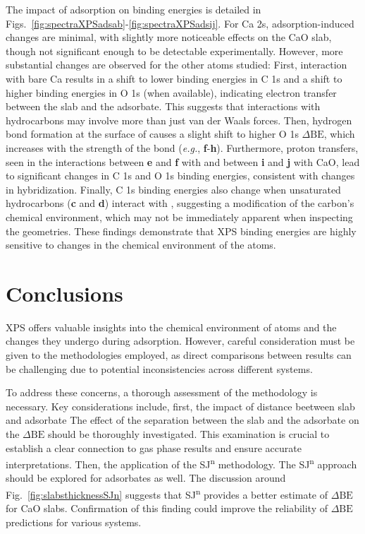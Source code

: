 \documentclass[journal=jpccck,manuscript=article]{achemso}
\def\dbe{\ensuremath{\Delta\text{BE}}}
\begin{document}
The impact of adsorption on binding energies is detailed in Figs.~\ref{fig:spectraXPSadsab}-\ref{fig:spectraXPSadsij}. For Ca 2s, adsorption-induced changes are minimal, with slightly more noticeable effects on the CaO slab, though not significant enough to be detectable experimentally. However, more substantial changes are observed for the other atoms studied: 
First, interaction with bare Ca results in a shift to lower binding energies in C 1s and a shift to higher binding energies in O 1s (when available), indicating electron transfer between the slab and the adsorbate. This suggests that interactions with hydrocarbons may involve more than just van der Waals forces. Then, hydrogen bond formation at the surface of  causes a slight shift to higher O 1s \dbe{}, which increases with the strength of the bond (\textit{e.g.}, \textbf{f}-\textbf{h}).
Furthermore, proton transfers, seen in the interactions between \textbf{e} and \textbf{f} with  and between \textbf{i} and \textbf{j} with CaO, lead to significant changes in C 1s and O 1s binding energies, consistent with changes in hybridization. Finally, C 1s binding energies also change when unsaturated hydrocarbons (\textbf{c} and \textbf{d}) interact with , suggesting a modification of the carbon's chemical environment, which may not be immediately apparent when inspecting the geometries.
These findings demonstrate that XPS binding energies are highly sensitive to changes in the chemical environment of the atoms.

\clearpage
\section{Conclusions}
XPS offers valuable insights into the chemical environment of atoms and the changes they undergo during adsorption. However, careful consideration must be given to the methodologies employed, as direct comparisons between results can be challenging due to potential inconsistencies across different systems.

To address these concerns, a thorough assessment of the methodology is necessary. Key considerations include, first, the impact of distance beetween slab and adsorbate The effect of the separation between the slab and the adsorbate on the \dbe{} should be thoroughly investigated. This examination is crucial to establish a clear connection to gas phase results and ensure accurate interpretations.
Then, the application of the SJ\textsuperscript{n} methodology. The SJ\textsuperscript{n} approach should be explored for adsorbates as well. The discussion around Fig.~\ref{fig:slabsthicknessSJn} suggests that SJ\textsuperscript{n} provides a better estimate of \dbe{} for CaO slabs. Confirmation of this finding could improve the reliability of \dbe{} predictions for various systems.
\end{document}
